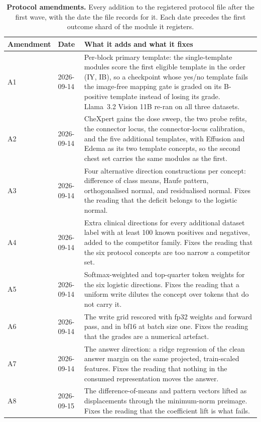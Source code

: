 \begin{table}[h]
\centering
\scriptsize
\setlength{\tabcolsep}{5pt}
\caption{\textbf{Protocol amendments.} Every addition to the registered protocol file after the first wave, with the date the file records for it. Each date precedes the first outcome shard of the module it registers.}
\label{tab:cf-amendments}
\begin{tabular}{ll>{\raggedright\arraybackslash}p{}}
\toprule
Amendment & Date & What it adds and what it fixes \\
\midrule
A1 & 2026-09-14 & Per-block primary template: the single-template modules score the first eligible template in the order (IY, IB), so a checkpoint whose yes/no template fails the image-free mapping gate is graded on its B-positive template instead of losing its grade. Llama~3.2 Vision 11B re-ran on all three datasets. \\
A2 & 2026-09-14 & CheXpert gains the dose sweep, the two probe refits, the connector locus, the connector-locus calibration, and the five additional templates, with Effusion and Edema as its two template concepts, so the second chest set carries the same modules as the first. \\
A3 & 2026-09-14 & Four alternative direction constructions per concept: difference of class means, Haufe pattern, orthogonalised normal, and residualised normal. Fixes the reading that the deficit belongs to the logistic normal. \\
A4 & 2026-09-14 & Extra clinical directions for every additional dataset label with at least 100 known positives and negatives, added to the competitor family. Fixes the reading that the six protocol concepts are too narrow a competitor set. \\
A5 & 2026-09-14 & Softmax-weighted and top-quarter token weights for the six logistic directions. Fixes the reading that a uniform write dilutes the concept over tokens that do not carry it. \\
A6 & 2026-09-14 & The write grid rescored with fp32 weights and forward pass, and in bf16 at batch size one. Fixes the reading that the grades are a numerical artefact. \\
A7 & 2026-09-14 & The answer direction: a ridge regression of the clean answer margin on the same projected, train-scaled features. Fixes the reading that nothing in the consumed representation moves the answer. \\
A8 & 2026-09-15 & The difference-of-means and pattern vectors lifted as displacements through the minimum-norm preimage. Fixes the reading that the coefficient lift is what fails. \\

\end{tabular}
\end{table}
